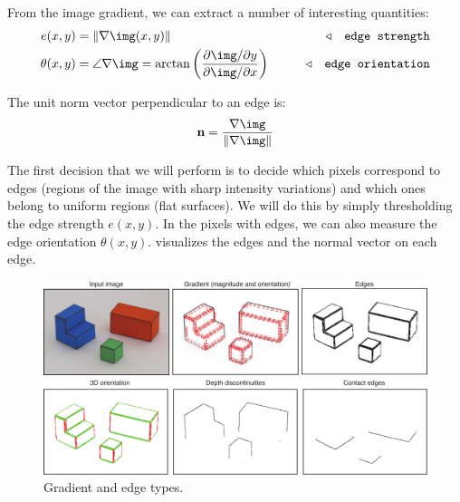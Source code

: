 From the image gradient, we can extract a number of interesting quantities:
 
\begin{align}
    e(x,y) &= \lVert \nabla \img(x,y) \rVert   & \quad\quad \triangleleft \quad \texttt{edge strength}\\
    \theta(x,y) &= \angle \nabla \img =  \arctan \left( \frac{\partial \img / \partial y}{\partial \img / \partial x} \right) & \quad\quad \triangleleft \quad \texttt{edge orientation}
\end{align}

The unit norm vector perpendicular to an edge is:
\begin{eqnarray}
{\bf n} = \frac{\nabla \img}{\lVert \nabla \img \rVert}
\end{eqnarray}






The first decision that we will perform is to decide which pixels correspond to edges (regions of the image with sharp intensity variations) and which ones belong to uniform regions (flat surfaces). We will do this by simply thresholding the edge strength $e(x,y)$. 
In the pixels with edges, we can also measure the edge orientation $\theta(x,y)$. \Fig{\ref{fig:gradient}} visualizes the edges and the normal vector on each edge. 


\begin{figure}[t]
\centerline{
\includegraphics[width=1\linewidth]{figures/simplesystem/gradient.pdf}
} 
\centerline{
\includegraphics[width=1\linewidth]{figures/simplesystem/edgeTypes.pdf}
} 
\caption{Gradient and edge types.} 
\label{fig:gradient}
\end{figure}


